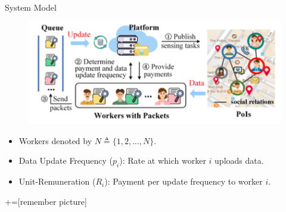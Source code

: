 \documentclass[aspectratio=169,xcolor=dvipsnames]{beamer}
\begin{document}
\begin{frame}[fragile]{System Model}
    \footnotesize %

    \begin{figure}
        \centering
        \includegraphics[width=0.6\linewidth]{system_model.png}
    \end{figure}\pause
    
    \begin{itemize}
        \setlength{\itemsep} %
        \item Workers denoted by \( N \triangleq \{1, 2, \ldots, N\} \).\\ \pause
        \item Data Update Frequency (\(p_i\)): Rate at which worker \(i\) uploads data.\\ \pause
        \item Unit-Remuneration (\(R_i\)): Payment per update frequency to worker \(i\).    
    \end{itemize}

\end{frame}





+=[remember picture]
\everymath{\displaystyle}
\end{document}
